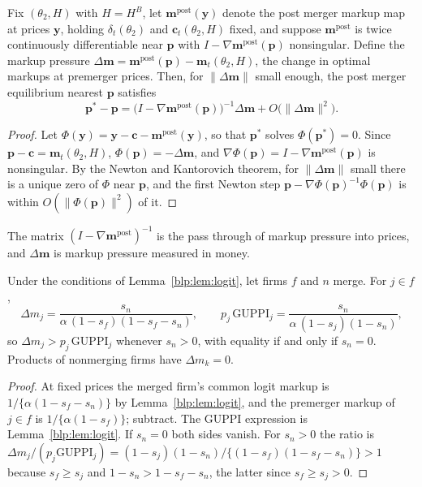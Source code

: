 \begin{proposition}\label{blp:prop:firstorder}
Fix $(\theta_2,H)$ with $H=H^B$, let $\bm m^{\mathrm{post}}(\bm y)$ denote the post merger markup
map at prices $\bm y$, holding $\delta_t(\theta_2)$ and $\bm c_t(\theta_2,H)$ fixed, and suppose
$\bm m^{\mathrm{post}}$ is twice continuously differentiable near $\bm p$ with $I - \nabla\bm
m^{\mathrm{post}}(\bm p)$ nonsingular. Define the markup pressure
$\Delta\bm m = \bm m^{\mathrm{post}}(\bm p) - \bm m_t(\theta_2,H)$, the change in optimal markups
at premerger prices. Then, for $\lVert\Delta\bm m\rVert$ small enough, the post merger equilibrium nearest $\bm p$ satisfies
\[
\bm p^\ast - \bm p = \bigl(I - \nabla\bm m^{\mathrm{post}}(\bm p)\bigr)^{-1}\Delta\bm m
+ O\bigl(\lVert\Delta\bm m\rVert^2\bigr).
\]
\end{proposition}
\begin{proof}
Let $\Phi(\bm y) = \bm y - \bm c - \bm m^{\mathrm{post}}(\bm y)$, so that $\bm p^\ast$ solves
$\Phi(\bm p^\ast)=0$. Since $\bm p - \bm c = \bm m_t(\theta_2,H)$, $\Phi(\bm p) = -\Delta\bm m$, and
$\nabla\Phi(\bm p) = I - \nabla\bm m^{\mathrm{post}}(\bm p)$ is nonsingular. By the
Newton and Kantorovich theorem, for $\lVert\Delta\bm m\rVert$ small there is a unique zero of
$\Phi$ near $\bm p$, and the first Newton step $\bm p - \nabla\Phi(\bm p)^{-1}\Phi(\bm p)$ is
within $O(\lVert\Phi(\bm p)\rVert^2)$ of it.
\end{proof}

The matrix $(I-\nabla\bm m^{\mathrm{post}})^{-1}$ is the pass through of markup pressure into
prices, and $\Delta\bm m$ is markup pressure measured in money. 

\begin{lemma}\label{blp:lem:pressure}
Under the conditions of Lemma~\ref{blp:lem:logit}, let firms $f$ and $n$ merge. For $j\in f$,
\[
\Delta m_j = \frac{s_n}{\alpha\,(1-s_f)(1-s_f-s_n)},\qquad
p_j\,\mathrm{GUPPI}_j = \frac{s_n}{\alpha\,(1-s_j)(1-s_n)},
\]
so $\Delta m_j > p_j\,\mathrm{GUPPI}_j$ whenever $s_n > 0$, with equality if and only if $s_n = 0$.
Products of nonmerging firms have $\Delta m_k = 0$.
\end{lemma}
\begin{proof}
At fixed prices the merged firm's common logit markup is $1/\{\alpha(1-s_f-s_n)\}$ by
Lemma~\ref{blp:lem:logit}, and the premerger markup of $j\in f$ is $1/\{\alpha(1-s_f)\}$; subtract.
The GUPPI expression is Lemma~\ref{blp:lem:logit}. If $s_n = 0$ both sides vanish. For $s_n>0$
the ratio is
$\Delta m_j/(p_j\mathrm{GUPPI}_j) = (1-s_j)(1-s_n)/\{(1-s_f)(1-s_f-s_n)\}>1$ because
$s_f\ge s_j$ and $1-s_n > 1-s_f-s_n$, the latter since $s_f\ge s_j>0$.
\end{proof}

